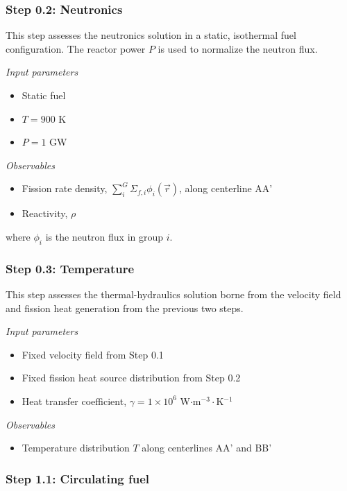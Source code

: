 \subsubsection{Step 0.2: Neutronics}

This step assesses the neutronics solution in a static, isothermal fuel
configuration. The reactor power $P$ is used to normalize the neutron flux.

\textit{Input parameters}
%
\begin{itemize}
    \item Static fuel
    \item $T = 900$ K
    \item $P = 1$ GW
\end{itemize}

\textit{Observables}
\begin{itemize}
    \item Fission rate density, $\sum^G_i \Sigma_{f,i} \phi_i(\vec{r})$, along
    centerline AA'
    \item Reactivity, $\rho$
\end{itemize}
where $\phi_i$ is the neutron flux in group $i$.

\subsubsection{Step 0.3: Temperature}

This step assesses the thermal-hydraulics solution borne from the velocity
field and fission heat generation from the previous two steps.

\textit{Input parameters}
%
\begin{itemize}
    \item Fixed velocity field from Step 0.1
    \item Fixed fission heat source distribution from Step 0.2
    \item Heat transfer coefficient, $\gamma = 1 \times 10^6$ W$\cdot$m$^{-3}
    \cdot$K$^{-1}$
\end{itemize}

\textit{Observables}
\begin{itemize}
    \item Temperature distribution $T$ along centerlines AA' and BB'
\end{itemize}

\subsubsection{Step 1.1: Circulating fuel}

